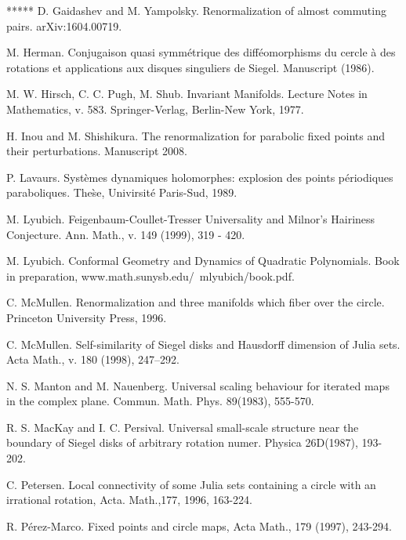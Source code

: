 \begin{thebibliography}{*****}
 D. Gaidashev and M. Yampolsky. Renormalization of almost commuting pairs. arXiv:1604.00719.


 M. Herman. Conjugaison quasi symm\'etrique des diff\'eomorphisms du cercle \`a des rotations
et applications aux disques singuliers de Siegel. Manuscript (1986).

 M. W. Hirsch, C. C. Pugh, M. Shub. Invariant Manifolds. Lecture Notes in Mathematics, v. 583. Springer-Verlag, Berlin-New York, 1977.






 H. Inou and M. Shishikura.
  The renormalization for parabolic fixed points and their
  perturbations. Manuscript 2008. 

  P. Lavaurs. Syst\`emes dynamiques holomorphes:
explosion des points p\'eriodiques paraboliques. The\`se, Univirsit\'e
Paris-Sud, 1989. 


 M. Lyubich. Feigenbaum-Coullet-Tresser Universality and Milnor's Hairiness Conjecture.
   Ann. Math., v. 149 (1999), 319 - 420.

 M. Lyubich. Conformal Geometry and Dynamics of
  Quadratic Polynomials. Book in preparation, www.math.sunysb.edu/~mlyubich/book.pdf. 



 C. McMullen. Renormalization and three manifolds
  which fiber over the circle.   Princeton University Press, 1996. 

 C. McMullen. Self-similarity of Siegel disks and Hausdorff dimension of Julia sets.
  Acta Math., v. 180 (1998), 247--292.  



 N. S. Manton and M. Nauenberg. Universal scaling behaviour for iterated maps in the complex plane.
Commun. Math. Phys. 89(1983), 555-570.


 R. S. MacKay and I. C. Persival. Universal small-scale structure near the boundary of Siegel disks of
arbitrary rotation numer. Physica 26D(1987), 193-202.



 C. Petersen. Local connectivity of some Julia sets containing a circle with an irrational rotation, Acta. Math.,177, 1996, 163-224.


  R. P\'erez-Marco. Fixed points and circle maps, Acta Math., 179 (1997), 243-294.



\end{thebibliography}
